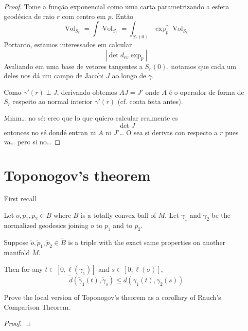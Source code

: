 \begin{proof}
Tome a função exponencial como uma carta parametrizando a esfera geodésica de
raio $r$ com centro em $p$. Então
$$
\operatorname{Vol}_{S_r}=\int
\operatorname{Vol}_{S_r}=
\int_{S_r(0)}\operatorname{exp}_p^*\operatorname{Vol}_{S_r}
$$
Portanto, estamos interessados em calcular 
$$
|\det d_{rv} \operatorname{exp}_p|
$$
Avaliando em uma base de vetores tangentes a $S_r(0)$, notamos que cada um deles
nos dá um campo de Jacobi $J$ ao longo de $\gamma$.

Como $\gamma'(r)\perp J$, derivando obtemos $A J=J'$ onde $A$ é o operador de
forma de $S_r$ respeito ao normal interior $\gamma'(r)$ (cf. conta feita antes).

Mmm… no sé: creo que lo que quiero calcular realmente es
$$
\det J
$$
entonces no sé dondé entran ni $A$ ni $J'$… O sea si derivas con respecto a $r$
pues va… pero si no…

\end{proof}

\section{Toponogov's theorem}
\label{section-toponogov}

First recall

\begin{theorem}
\label{theorem-toponogov,local}
Let $o,p_1,p_2 \in B$ where $B$ is a totally convex ball of $M$. Let $\gamma_1$
and $\gamma_2$ be the normalized geodesics joining $o$ to $p_1$ and to $p_2$.

Suppose $\tilde{o}, \tilde{p}_1,\tilde{p}_2 \in \tilde{B}$ is a triple with the
exact same properties on another manifold $\tilde{M}$.

Then for any $t \in [0,\ell(\gamma_1)]$ and $s \in [0,\ell(\sigma)]$,
$$
\tilde{d}(\tilde{\gamma}_1(t),\tilde{\gamma}_s)\leq d(\gamma_1(t),\gamma_2(s))
$$

\end{theorem}

\begin{exercise}[Lista 7]
\label{exercise-toponogov-from-rauch}
Prove the local version of Toponogov's theorem as a corollary of Rauch's
Comparison Theorem.
\end{exercise}

\begin{proof}

\end{proof}


